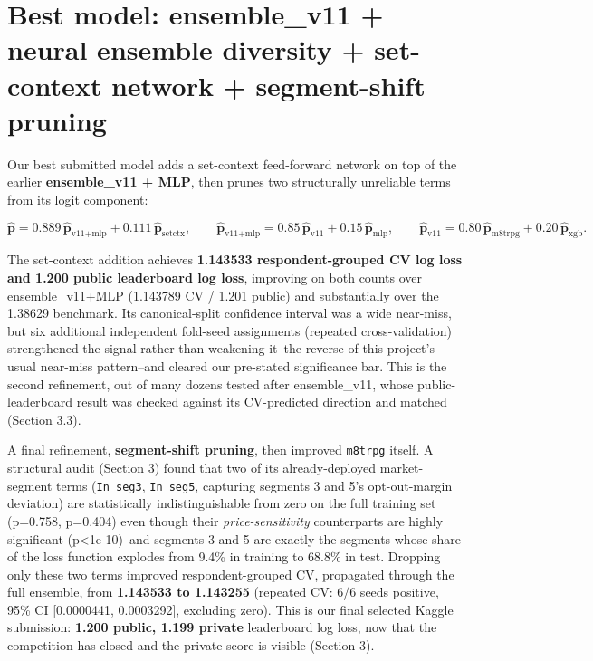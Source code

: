 \documentclass[
  9.5pt,
]{article}
\begin{document}
\section{Best model: ensemble\_v11 + neural ensemble diversity +
set-context network + segment-shift
pruning}\label{best-model-ensemble_v11-neural-ensemble-diversity-set-context-network-segment-shift-pruning}

Our best submitted model adds a set-context feed-forward network on top
of the earlier \textbf{ensemble\_v11 + MLP}, then prunes two
structurally unreliable terms from its logit component:

\[
\hat{\mathbf p}=0.889\,\hat{\mathbf p}_{\text{v11+mlp}}+0.111\,\hat{\mathbf p}_{\text{setctx}},
\qquad
\hat{\mathbf p}_{\text{v11+mlp}}=0.85\,\hat{\mathbf p}_{\text{v11}}+0.15\,\hat{\mathbf p}_{\text{mlp}},
\qquad
\hat{\mathbf p}_{\text{v11}}=0.80\,\hat{\mathbf p}_{\text{m8trpg}}+
0.20\,\hat{\mathbf p}_{\text{xgb}}.
\]

The set-context addition achieves \textbf{1.143533 respondent-grouped CV
log loss and 1.200 public leaderboard log loss}, improving on both
counts over ensemble\_v11+MLP (1.143789 CV / 1.201 public) and
substantially over the 1.38629 benchmark. Its canonical-split confidence
interval was a wide near-miss, but six additional independent fold-seed
assignments (repeated cross-validation) strengthened the signal rather
than weakening it--the reverse of this project's usual near-miss
pattern--and cleared our pre-stated significance bar. This is the second
refinement, out of many dozens tested after ensemble\_v11, whose
public-leaderboard result was checked against its CV-predicted direction
and matched (Section 3.3).

A final refinement, \textbf{segment-shift pruning}, then improved
\texttt{m8trpg} itself. A structural audit (Section 3) found that two of
its already-deployed market-segment terms (\texttt{In\_seg3},
\texttt{In\_seg5}, capturing segments 3 and 5's opt-out-margin
deviation) are statistically indistinguishable from zero on the full
training set (p=0.758, p=0.404) even though their
\emph{price-sensitivity} counterparts are highly significant
(p\textless1e-10)--and segments 3 and 5 are exactly the segments whose
share of the loss function explodes from 9.4\% in training to 68.8\% in
test. Dropping only these two terms improved respondent-grouped CV,
propagated through the full ensemble, from \textbf{1.143533 to 1.143255}
(repeated CV: 6/6 seeds positive, 95\% CI {[}0.0000441, 0.0003292{]},
excluding zero). This is our final selected Kaggle submission:
\textbf{1.200 public, 1.199 private} leaderboard log loss, now that the
competition has closed and the private score is visible (Section 3).
\end{document}
